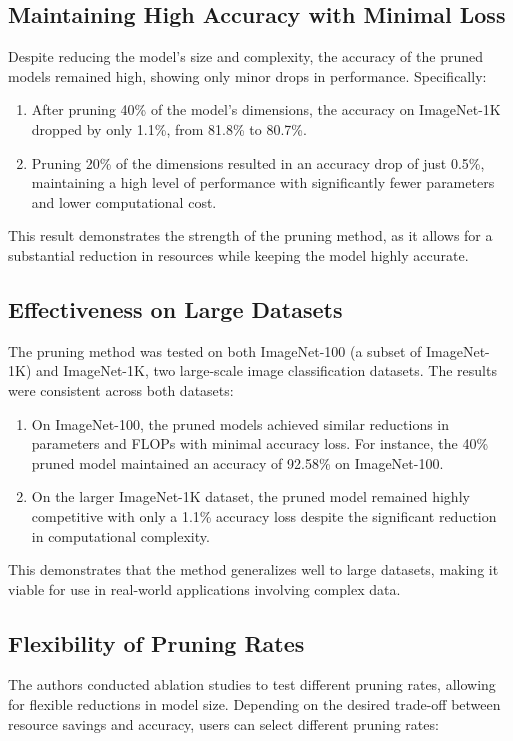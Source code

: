 \documentclass{report}
\begin{document}
	
	\subsection{Maintaining High Accuracy with Minimal Loss}
	Despite reducing the model's size and complexity, the accuracy of the pruned models remained high, showing only minor drops in performance. Specifically:
	
	
	\begin{enumerate}
		\item 
		After pruning 40\% of the model’s dimensions, the accuracy on ImageNet-1K dropped by only 1.1\%, from 81.8\% to 80.7\%.
		
		\item 
		Pruning 20\% of the dimensions resulted in an accuracy drop of just 0.5\%, maintaining a high level of performance with significantly fewer parameters and lower computational cost.
	\end{enumerate}
	This result demonstrates the strength of the pruning method, as it allows for a substantial reduction in resources while keeping the model highly accurate.
	
	
	
	\subsection{Effectiveness on Large Datasets}
	The pruning method was tested on both ImageNet-100 (a subset of ImageNet-1K) and ImageNet-1K, two large-scale image classification datasets. The results were consistent across both datasets:
	
	
	\begin{enumerate}
		\item 
		On ImageNet-100, the pruned models achieved similar reductions in parameters and FLOPs with minimal accuracy loss. For instance, the 40\% pruned model maintained an accuracy of 92.58\% on ImageNet-100.
		
		\item 
		On the larger ImageNet-1K dataset, the pruned model remained highly competitive with only a 1.1\% accuracy loss despite the significant reduction in computational complexity.
	\end{enumerate}
	This demonstrates that the method generalizes well to large datasets, making it viable for use in real-world applications involving complex data.
	
	
	\subsection{Flexibility of Pruning Rates}
	The authors conducted ablation studies to test different pruning rates, allowing for flexible reductions in model size. Depending on the desired trade-off between resource savings and accuracy, users can select different pruning rates:
	
\end{document}
